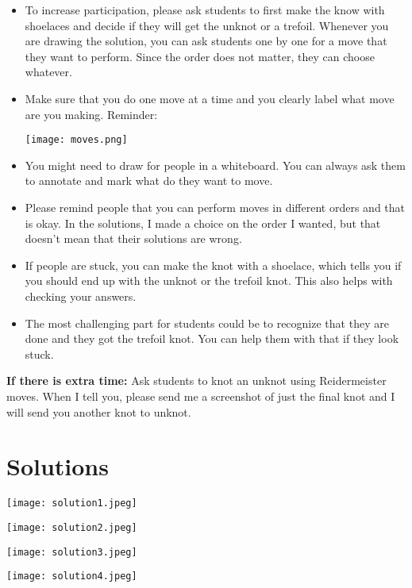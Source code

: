 \documentclass[12pt,letterpaper]{article}
\begin{document}
\begin{itemize}

    \item To increase participation, please ask students to first make the know with shoelaces and decide if they will get the unknot or a trefoil. Whenever you are drawing the solution, you can ask students one by one for a move that they want to perform. Since the order does not matter, they can choose whatever.
    
    \item Make sure that you do one move at a time and you clearly label what move are you making. Reminder:
    
    \texttt{[image: moves.png]}
    
    \item You might need to draw for people in a whiteboard. You can always ask them to annotate and mark what do they want to move.
    
    \item Please remind people that you can perform moves in different orders and that is okay. In the solutions, I made a choice on the order I wanted, but that doesn't mean that their solutions are wrong.
    
    \item If people are stuck, you can make the knot with a shoelace, which tells you if you should end up with the unknot or the trefoil knot. This also helps with checking your answers.
    
    \item The most challenging part for students could be to recognize that they are done and they got the trefoil knot. You can help them with that if they look stuck.
\end{itemize}


\textbf{If there is extra time:}
Ask students to knot an unknot using Reidermeister moves. When I tell you, please send me a screenshot of just the final knot and I will send you another knot to unknot.

\section*{Solutions}
\begin{center}
    \texttt{[image: solution1.jpeg]}
    
    \texttt{[image: solution2.jpeg]}
    
    \texttt{[image: solution3.jpeg]}
    
    \texttt{[image: solution4.jpeg]}
\end{center}
\end{document}
